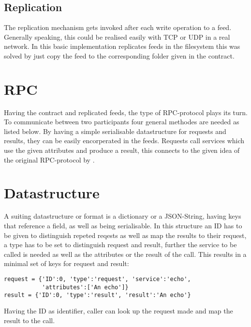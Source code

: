 \subsection{Replication}
The replication mechanism gets invoked after each write operation to a feed. Generally speaking, this could be realised easily with TCP or UDP in a real network. In this basic implementation replicates feeds in the filesystem this was solved by just copy the feed to the corresponding folder given in the contract.
\section{RPC}
Having the contract and replicated feeds, the type of RPC-protocol plays its turn. To communicate between two participants four general methodes are needed as listed below. By having a simple serialisable datastructure for requests and results, they can be easily encorperated in the feeds. Requests call services which use the given attributes and produce a result, this connects to the given idea of the original RPC-protocol by \citet{birrell1984implementing}.
\section{Datastructure}
A suiting datastructure or format is a dictionary or a JSON-String, having keys that reference a field, as well as being serialisable. In this structure an ID has to be given to distinguish repeted reqests as well as map the results to their request, a type has to be set to distinguish request and result, further the service to be called is needed as well as the attributes or the result of the call. This results in a minimal set of keys for request and result:\\

\begin{lstlisting}
request = {'ID':0, 'type':'request', 'service':'echo', 
           'attributes':['An echo']}
result = {'ID':0, 'type':'result', 'result':'An echo'}
\end{lstlisting}


Having the ID as identifier, caller can look up the request made and map the result to the call.
